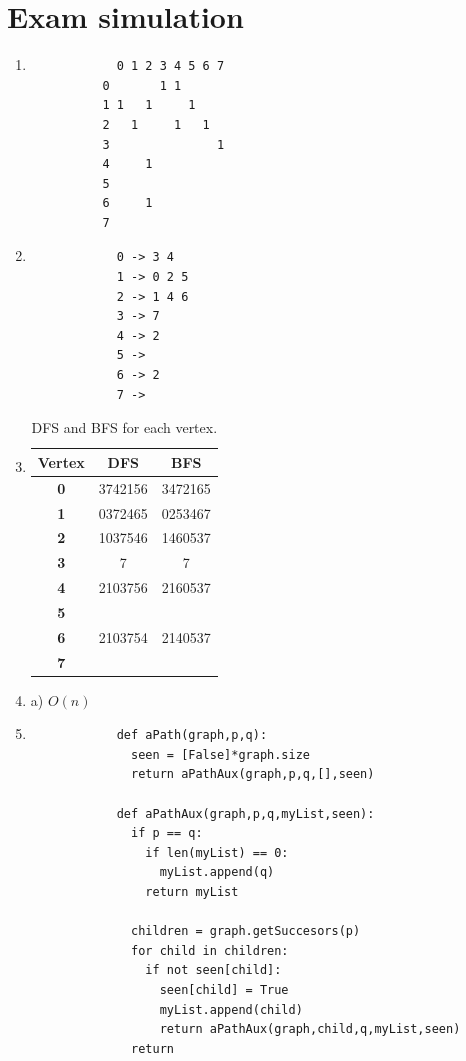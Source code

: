 \documentclass[a4paper,12pt]{article}
\begin{document}
    \section{Exam simulation}
      \begin{enumerate}
        \item
          \begin{Verbatim}
            0 1 2 3 4 5 6 7
          0       1 1
          1 1   1     1
          2   1     1   1
          3               1
          4     1
          5
          6     1
          7
          \end{Verbatim}
        \item
          \begin{Verbatim}
            0 -> 3 4
            1 -> 0 2 5
            2 -> 1 4 6
            3 -> 7
            4 -> 2
            5 ->
            6 -> 2
            7 ->
          \end{Verbatim}
        \item
        \begin{table}[H]
        \centering
        \caption{DFS and BFS for each vertex.}
        \begin{tabular}{ccc}
        \hline
        \textbf{Vertex}           & \textbf{DFS} & \textbf{BFS} \\ \hline
        \textbf{0} & 3742156      & 3472165      \\
        \textbf{1} & 0372465      & 0253467      \\
        \textbf{2} & 1037546      & 1460537      \\
        \textbf{3} & 7            & 7            \\
        \textbf{4} & 2103756      & 2160537      \\
        \textbf{5} &              &              \\
        \textbf{6} & 2103754      & 2140537      \\
        \textbf{7} &              &              \\ \hline
        \end{tabular}
        \end{table}
        \item a) $O(n)$
        \item
          \begin{Verbatim}
            def aPath(graph,p,q):
              seen = [False]*graph.size
              return aPathAux(graph,p,q,[],seen)

            def aPathAux(graph,p,q,myList,seen):
              if p == q:
                if len(myList) == 0:
                  myList.append(q)
                return myList

              children = graph.getSuccesors(p)
              for child in children:
                if not seen[child]:
                  seen[child] = True
                  myList.append(child)
                  return aPathAux(graph,child,q,myList,seen)
              return
          \end{Verbatim}
      \end{enumerate}
\end{document}
